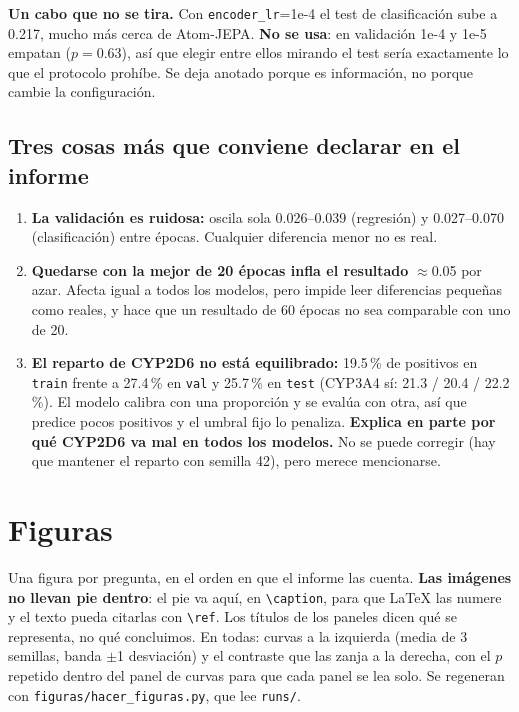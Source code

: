 \documentclass[11pt,a4paper]{article}
\newcommand{\var}[1]{\texttt{#1}}
\begin{document}
\noindent\textbf{Un cabo que no se tira.} Con \var{encoder\_lr}=1e-4 el test de clasificación sube a
0.217, mucho más cerca de Atom-JEPA. \textbf{No se usa}: en validación 1e-4 y 1e-5 empatan ($p=0.63$),
así que elegir entre ellos mirando el test sería exactamente lo que el protocolo prohíbe. Se deja
anotado porque es información, no porque cambie la configuración.

\subsection*{Tres cosas más que conviene declarar en el informe}
\begin{enumerate}
  \item \textbf{La validación es ruidosa:} oscila sola 0.026--0.039 (regresión) y 0.027--0.070
        (clasificación) entre épocas. Cualquier diferencia menor no es real.
  \item \textbf{Quedarse con la mejor de 20 épocas infla el resultado} $\approx$0.05 por azar. Afecta
        igual a todos los modelos, pero impide leer diferencias pequeñas como reales, y hace que un
        resultado de 60 épocas no sea comparable con uno de 20.
  \item \textbf{El reparto de CYP2D6 no está equilibrado:} 19.5\,\% de positivos en \var{train} frente
        a 27.4\,\% en \var{val} y 25.7\,\% en \var{test} (CYP3A4 sí: 21.3 / 20.4 / 22.2\,\%). El modelo
        calibra con una proporción y se evalúa con otra, así que predice pocos positivos y el umbral
        fijo lo penaliza. \textbf{Explica en parte por qué CYP2D6 va mal en todos los modelos.} No se
        puede corregir (hay que mantener el reparto con semilla 42), pero merece mencionarse.
\end{enumerate}

\newpage
\section{Figuras}

Una figura por pregunta, en el orden en que el informe las cuenta. \textbf{Las imágenes no llevan pie
dentro}: el pie va aquí, en \var{\textbackslash caption}, para que LaTeX las numere y el texto pueda
citarlas con \var{\textbackslash ref}. Los títulos de los paneles dicen qué se representa, no qué
concluimos. En todas: curvas a la izquierda (media de 3 semillas, banda $\pm$1 desviación) y el
contraste que las zanja a la derecha, con el $p$ repetido dentro del panel de curvas para que cada
panel se lea solo. Se regeneran con \var{figuras/hacer\_figuras.py}, que lee \var{runs/}.
\end{document}
